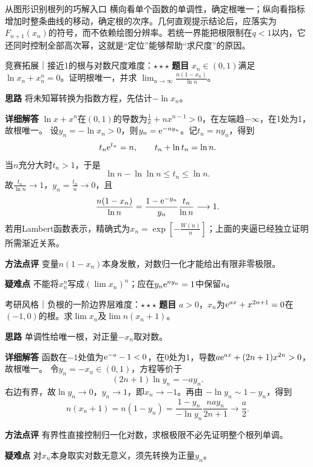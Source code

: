 \begin{method}{从图形识别根列的巧解入口}
横向看单个函数的单调性，确定根唯一；纵向看指标增加时整条曲线的移动，确定根的次序。几何直观提示结论后，应落实为$F_{n+1}(x_n)$的符号，而不依赖绘图分辨率。若统一界能把根限制在$q<1$以内，它还同时控制全部高次幂，这就是“定位”能够帮助“求尺度”的原因。
\end{method}

\begin{example}{竞赛拓展｜接近1的根与对数尺度}{难度：$\star\star\star$}\label{cs:ex:logroot}
\textbf{题目} $x_n\in(0,1)$满足$\ln x_n+x_n^n=0$。证明根唯一，并求
$\lim_{n\to\infty}\frac{n(1-x_n)}{\ln n}$。
\par\textbf{思路} 将未知幂转换为指数方程，先估计$-\ln x_n$。
\par\textbf{详细解答} $\ln x+x^n$在$(0,1)$的导数为$\frac{1}{x}+nx^{n-1}>0$，在左端趋$-\infty$，在1处为1，故根唯一。
设$y_n=-\ln x_n>0$，则$y_n=\mathrm{e}^{-ny_n}$。记$t_n=ny_n$，得到
\[
t_n\mathrm{e}^{t_n}=n,\qquad t_n+\ln t_n=\ln n.
\]
当$n$充分大时$t_n>1$，于是
\[
\ln n-\ln\ln n\le t_n\le\ln n.
\]
故$\frac{t_n}{\ln n}\to1$，$y_n=\frac{t_n}{n}\to0$，且
\[
\dfrac{n(1-x_n)}{\ln n}
=\dfrac{1-\mathrm{e}^{-y_n}}{y_n}\dfrac{t_n}{\ln n}\longrightarrow1.
\]
若用Lambert函数表示，精确式为$x_n=\exp[-\frac{W(n)}{n}]$；上面的夹逼已经独立证明所需渐近关系。
\par\textbf{方法点评} 变量$n(1-x_n)$本身发散，对数归一化才能给出有限非零极限。
\par\textbf{疑难点} 不能将$x_n^n$写成$(\lim x_n)^n$；应在$y_n\mathrm{e}^{ny_n}=1$中保留$n$。
\end{example}

\begin{example}{考研风格｜负根的一阶边界层}{难度：$\star\star\star$}\label{cs:ex:negativeroot}
\textbf{题目} $a>0$，$x_n$为$\mathrm{e}^{ax}+x^{2n+1}=0$在$(-1,0)$的根。求$\lim x_n$及$\lim n(x_n+1)$。
\par\textbf{思路} 单调性给唯一根，对正量$-x_n$取对数。
\par\textbf{详细解答} 函数在$-1$处值为$\mathrm{e}^{-a}-1<0$，在0处为1，导数$a\mathrm{e}^{ax}+(2n+1)x^{2n}>0$，故根唯一。
令$y_n=-x_n\in(0,1)$，方程等价于
\[
(2n+1)\ln y_n=-ay_n.
\]
右边有界，故$\ln y_n\to0$，$y_n\to1$，即$x_n\to-1$。再由
$-\ln y_n\sim1-y_n$，得到
\[
n(x_n+1)=n(1-y_n)
 =\dfrac{1-y_n}{-\ln y_n}\dfrac{nay_n}{2n+1}
 \longrightarrow\dfrac a2.
\]
\par\textbf{方法点评} 有界性直接控制归一化对数，求根极限不必先证明整个根列单调。
\par\textbf{疑难点} 对$x_n$本身取实对数无意义，须先转换为正量$y_n$。
\end{example}

